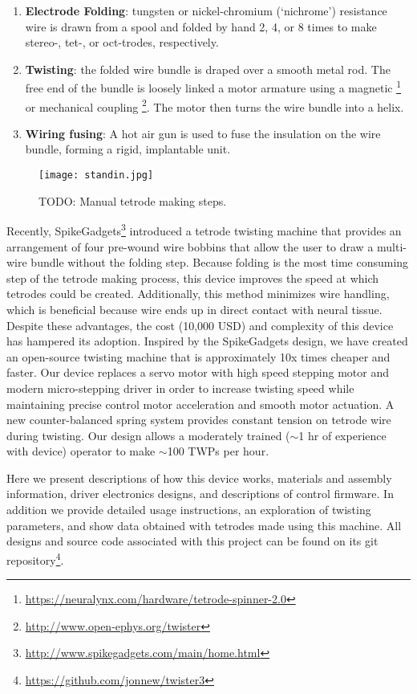 \documentclass[11pt,a4paper]{article}
\begin{document}
\begin{enumerate}
    \item \textbf{Electrode Folding}: tungsten or nickel-chromium (`nichrome')
        resistance wire is drawn from a spool and folded by hand 2, 4, or 8
        times to make stereo-, tet-, or oct-trodes, respectively.
    \item \textbf{Twisting}: the folded wire bundle is draped over a smooth
        metal rod. The free end of the bundle is loosely linked a motor armature using a
        magnetic
        \footnote{\url{https://neuralynx.com/hardware/tetrode-spinner-2.0}} or
        mechanical coupling
        \footnote{\url{http://www.open-ephys.org/twister}}.
        The motor then turns the wire bundle into a helix.
    \item \textbf{Wiring fusing}: A hot air gun is used to fuse the insulation
        on the wire bundle, forming a rigid, implantable unit.
\end{enumerate}

\begin{figure}
    \centering
    \texttt{[image: standin.jpg]}
    \caption{TODO: Manual tetrode making steps.}
    \label{f:manual-steps}
\end{figure}

Recently,
SpikeGadgets\footnote{\url{http://www.spikegadgets.com/main/home.html}}
introduced a tetrode twisting machine that provides an arrangement of four
pre-wound wire bobbins that allow the user to draw a multi-wire bundle without
the folding step. Because folding is the most time consuming step of the
tetrode making process, this device improves the speed at which tetrodes could
be created. Additionally, this method minimizes wire handling, which is
beneficial because wire ends up in direct contact with neural tissue. Despite
these advantages, the cost (10,000 USD) and complexity of this device has
hampered its adoption. Inspired by the SpikeGadgets design, we have created an
open-source twisting machine that is approximately 10x times cheaper and
faster. Our device replaces a servo motor with high speed stepping
motor and modern micro-stepping driver in order to increase twisting
speed while maintaining precise control motor acceleration and smooth motor
actuation. A new counter-balanced spring system provides constant tension on
tetrode wire during twisting. Our design allows a moderately trained ($\sim$1 hr of
experience with device) operator to make $\sim$100 TWPs per hour.

Here we present descriptions of how this device works, materials and assembly
information, driver electronics designs, and descriptions of control firmware.
In addition we provide detailed usage instructions, an exploration of twisting
parameters, and show data obtained with tetrodes made using this machine. All
designs and source code associated with this project can be found on its git
repository\footnote{\url{https://github.com/jonnew/twister3}}.
\end{document}
